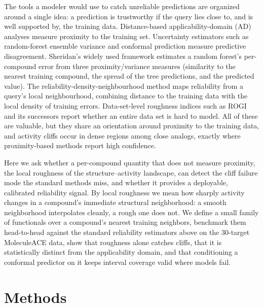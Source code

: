 \documentclass[11pt,letterpaper]{article}
\begin{document}
The tools a modeler would use to catch unreliable predictions are organized around a single idea: a prediction is trustworthy if the query lies close to, and is well supported by, the training data. Distance-based applicability-domain (AD) analyses\cite{netzeva2005,sahigara2012} measure proximity to the training set. Uncertainty estimators such as random-forest ensemble variance and conformal prediction\cite{norinder2014,hirschfeld2020} measure predictive disagreement. Sheridan's widely used framework estimates a random forest's per-compound error from three proximity/variance measures (similarity to the nearest training compound, the spread of the tree predictions, and the predicted value).\cite{sheridan2012} The reliability-density-neighbourhood method maps reliability from a query's local neighbourhood, combining distance to the training data with the local density of training errors.\cite{aniceto2016} Data-set-level roughness indices such as ROGI\cite{aldeghi2022} and its successors\cite{graff2023,golbraikh2014,peltason2007} report whether an entire data set is hard to model. All of these are valuable, but they share an orientation around proximity to the training data, and activity cliffs occur in dense regions among close analogs, exactly where proximity-based methods report high confidence.

Here we ask whether a per-compound quantity that does not measure proximity, the local roughness of the structure--activity landscape, can detect the cliff failure mode the standard methods miss, and whether it provides a deployable, calibrated reliability signal. By local roughness we mean how sharply activity changes in a compound's immediate structural neighborhood: a smooth neighborhood interpolates cleanly, a rough one does not. We define a small family of functionals over a compound's nearest training neighbors, benchmark them head-to-head against the standard reliability estimators above on the 30-target MoleculeACE data, show that roughness alone catches cliffs, that it is statistically distinct from the applicability domain, and that conditioning a conformal predictor on it keeps interval coverage valid where models fail.

\section*{Methods}
\end{document}

